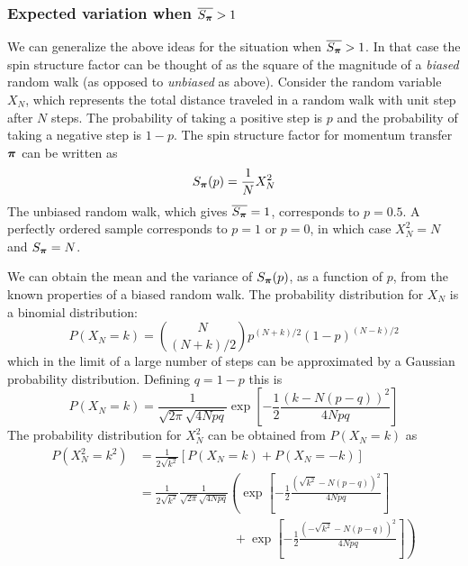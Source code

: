 \subsubsection{Expected variation when $\overline{S_{\bm{\pi}}} > 1$}

We can generalize the above ideas for the situation when
$\overline{S_{\bm{\pi}}} > 1$.  In that case the spin structure factor can
be thought of as the square of the magnitude of a \textit{biased} random
walk (as opposed to \textit{unbiased} as above).  Consider the random
variable $X_{N}$, which represents the total distance traveled in a random
walk with unit step after $N$ steps.  The probability of taking a positive
step is $p$ and the probability of taking a negative step is $1-p$. The spin
structure factor for momentum transfer $\bm{\pi}$ can be written as  
\begin{equation*}
  S_{\bm{\pi}}(p) = \frac{1}{N}  X_{N}^{2}  
\end{equation*}
The unbiased random walk, which gives $\overline{S_{\bm{\pi}}}=1$,
corresponds to $p=0.5$.  A perfectly ordered sample corresponds to $p=1$ or
$p=0$, in which case $X_{N}^{2}=N$ and $S_{\bm{\pi}}=N$.

We can obtain the mean and the variance of $S_{\bm{\pi}}(p)$, as a function
of $p$, from the known properties of a biased random walk.  The probability
distribution for $X_{N}$ is a binomial distribution: 
\begin{equation}
  P(X_{N}=k) = \binom{N}{ (N+k)/2 } p^{(N+k)/2} (1-p)^{(N-k)/2} 
\end{equation}
which in the limit of a large number of steps can be approximated by a
Gaussian probability distribution.  Defining $q=1-p$ this is
\begin{equation}
  P(X_{N}=k) =  \frac{1}{\sqrt{2\pi}\sqrt{4 N pq}} 
\exp\left[ -\frac{1}{2}\frac{(k-N(p-q))^{2}}{4 N pq }  \right]
\end{equation}
The probability distribution for $X_{N}^{2}$ can be obtained from $P(X_{N}=k)$ as 
\begin{equation}
\begin{split}
  P( X_{N}^{2} = k^{2} ) & = \frac{1}{2\sqrt{k^{2}}} [P( X_{N}=k)+P(X_{N}=-k)] \\
   & =
 \frac{1}{2\sqrt{k^{2}}} 
   \frac{1}{\sqrt{2\pi}\sqrt{4 N pq}} 
  \left(
\exp\left[ -\frac{1}{2}\frac{(\sqrt{k^{2}}-N(p-q))^{2}}{4 N pq }  \right]\right. \\
 & ~~~~~~~~~~~~~~~~~~~~~~~~~~~~~~~~~~ + \left.
\exp\left[ -\frac{1}{2}\frac{(-\sqrt{k^{2}}-N(p-q))^{2}}{4 N pq }  \right]  \right)
\end{split}
\end{equation}

